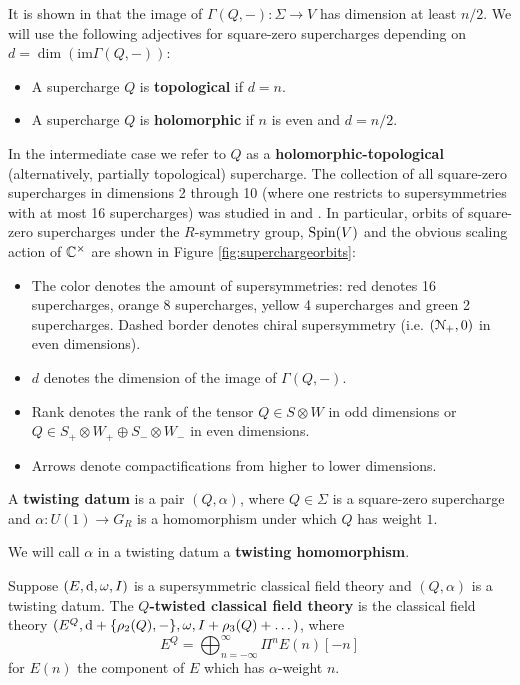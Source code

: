 \documentclass[10pt, oneside]{article}
\begin{document}
It is shown in \cite[Proposition 3.25]{ElliottSafronov} that the image of $\Gamma(Q, -)\colon \Sigma\rightarrow V$ has dimension at least $n/2$. We will use the following adjectives for square-zero supercharges depending on $d=\dim(\mathrm{im}\Gamma(Q, -))$:
\begin{itemize}
\item A supercharge $Q$ is {\bf topological} if $d = n$.

\item A supercharge $Q$ is {\bf holomorphic} if $n$ is even and $d=n/2$.
\end{itemize}

In the intermediate case we refer to $Q$ as a {\bf holomorphic-topological} (alternatively, partially topological) supercharge. The collection of all square-zero supercharges in dimensions 2 through 10 (where one restricts to supersymmetries with at most 16 supercharges) was studied in \cite{ElliottSafronov} and \cite{EagerSaberiWalcher}. In particular, orbits of square-zero supercharges under the $R$-symmetry group, $\mathrm{Spin}(V)$ and the obvious scaling action of $\mathbb C^\times$ are shown in Figure \ref{fig:superchargeorbits}:
\begin{itemize}
\item The color denotes the amount of supersymmetries: red denotes 16 supercharges, orange 8 supercharges, yellow 4 supercharges and green 2 supercharges. Dashed border denotes chiral supersymmetry (i.e. $(\mathcal N_+, 0)$ in even dimensions).

\item $d$ denotes the dimension of the image of $\Gamma(Q, -)$.

\item Rank denotes the rank of the tensor $Q\in S\otimes W$ in odd dimensions or $Q\in S_+\otimes W_+\oplus S_-\otimes W_-$ in even dimensions.

\item Arrows denote compactifications from higher to lower dimensions.
\end{itemize}

\begin{definition}
A {\bf twisting datum} is a pair $(Q, \alpha)$, where $Q\in\Sigma$ is a square-zero supercharge and $\alpha\colon U(1)\rightarrow G_R$ is a homomorphism under which $Q$ has weight $1$.
\end{definition}

We will call $\alpha$ in a twisting datum a {\bf twisting homomorphism}.

\begin{definition}
Suppose $(E, {\rm d}, \omega, I)$ is a supersymmetric classical field theory and $(Q, \alpha)$ is a twisting datum. The {\bf $Q$-twisted classical field theory} is the classical field theory $(E^Q, {\rm d} + \{\rho_2(Q), -\}, \omega, I + \rho_3(Q) + \dots)$, where
\[E^Q = \bigoplus_{n=-\infty}^\infty \Pi^n E(n)[-n]\]
for $E(n)$ the component of $E$ which has $\alpha$-weight $n$.
\end{definition}
\end{document}
